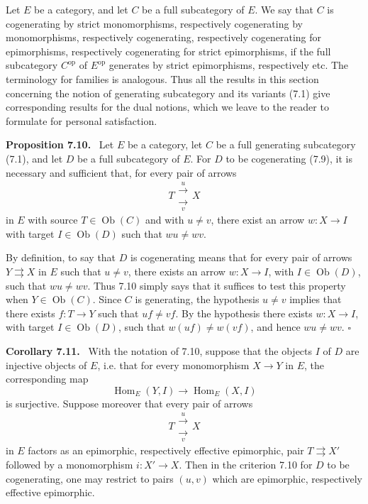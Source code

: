 \documentclass[11pt]{article}
\newcommand{\Ob}{\operatorname{Ob}}
\newcommand{\Hom}{\operatorname{Hom}}
\newcommand{\op}{\mathrm{op}}
\newcommand{\qedtext}{\hfill\(\square\)}
\newenvironment{statement}[1]{\par\medskip\noindent\textbf{#1.}\ }{\par\medskip}
\begin{document}
Let $E$ be a category, and let $C$ be a full subcategory of $E$. We say that $C$ is cogenerating by strict monomorphisms, respectively cogenerating by monomorphisms, respectively cogenerating, respectively cogenerating for epimorphisms, respectively cogenerating for strict epimorphisms, if the full subcategory $C^{\op}$ of $E^{\op}$ generates by strict epimorphisms, respectively etc. The terminology for families is analogous. Thus all the results in this section concerning the notion of generating subcategory and its variants (7.1) give corresponding results for the dual notions, which we leave to the reader to formulate for personal satisfaction.

\begin{statement}{Proposition 7.10}
Let $E$ be a category, let $C$ be a full generating subcategory (7.1), and let $D$ be a full subcategory of $E$. For $D$ to be cogenerating (7.9), it is necessary and sufficient that, for every pair of arrows
\[
T\mathrel{\substack{\xrightarrow{u}\\[-0.6ex]\xrightarrow[v]{}}}X
\]
in $E$ with source $T\in\Ob(C)$ and with $u\neq v$, there exist an arrow $w:X\to I$ with target $I\in\Ob(D)$ such that $wu\neq wv$.
\end{statement}

By definition, to say that $D$ is cogenerating means that for every pair of arrows $Y\rightrightarrows X$ in $E$ such that $u\neq v$, there exists an arrow $w:X\to I$, with $I\in\Ob(D)$, such that $wu\neq wv$. Thus 7.10 simply says that it suffices to test this property when $Y\in\Ob(C)$. Since $C$ is generating, the hypothesis $u\neq v$ implies that there exists $f:T\to Y$ such that $uf\neq vf$. By the hypothesis there exists $w:X\to I$, with target $I\in\Ob(D)$, such that $w(uf)\neq w(vf)$, and hence $wu\neq wv$. \qedtext

\begin{statement}{Corollary 7.11}
With the notation of 7.10, suppose that the objects $I$ of $D$ are injective objects of $E$, i.e. that for every monomorphism $X\to Y$ in $E$, the corresponding map
\[
\Hom_E(Y,I)\longrightarrow\Hom_E(X,I)
\]
is surjective. Suppose moreover that every pair of arrows
\[
T\mathrel{\substack{\xrightarrow{u}\\[-0.6ex]\xrightarrow[v]{}}}X
\]
in $E$ factors as an epimorphic, respectively effective epimorphic, pair $T\rightrightarrows X'$ followed by a monomorphism $i:X'\to X$. Then in the criterion 7.10 for $D$ to be cogenerating, one may restrict to pairs $(u,v)$ which are epimorphic, respectively effective epimorphic.
\end{statement}
\end{document}
